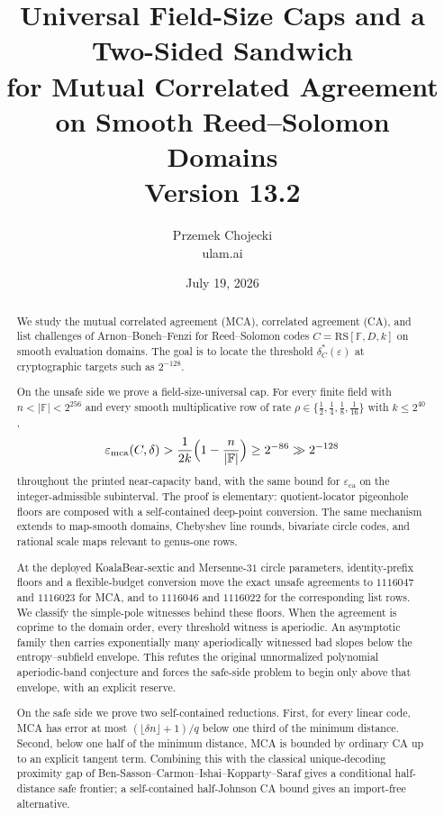 \documentclass[11pt]{article}
\title{Universal Field-Size Caps and a Two-Sided Sandwich\\ for Mutual Correlated Agreement on Smooth Reed--Solomon Domains\\\large Version 13.2}
\author{Przemek Chojecki\\ \small ulam.ai}
\date{July 19, 2026}
\theoremstyle{definition}
\theoremstyle{remark}
\newcommand{\F}{\mathbb{F}}
\newcommand{\RS}{\mathrm{RS}}
\newcommand{\eca}{\varepsilon_{\mathrm{ca}}}
\newcommand{\emca}{\varepsilon_{\mathrm{mca}}}
\begin{document}
\maketitle

\begin{abstract}
We study the mutual correlated agreement (MCA), correlated agreement (CA), and list challenges of Arnon--Boneh--Fenzi \cite{ABF26} for Reed--Solomon codes $C=\RS[\F,D,k]$ on smooth evaluation domains.  The goal is to locate the threshold $\delta_C^*(\varepsilon)$ at cryptographic targets such as $2^{-128}$.

On the unsafe side we prove a field-size-universal cap.  For every finite field with $n<|\F|<2^{256}$ and every smooth multiplicative row of rate $\rho\in\{\frac12,\frac14,\frac18,\frac1{16}\}$ with $k\le2^{40}$,
\[
\emca(C,\delta)>\frac1{2k}\Bigl(1-\frac n{|\F|}\Bigr)\ge2^{-86}\gg2^{-128}
\]
throughout the printed near-capacity band, with the same bound for $\eca$ on the integer-admissible subinterval.  The proof is elementary: quotient-locator pigeonhole floors are composed with a self-contained deep-point conversion.  The same mechanism extends to map-smooth domains, Chebyshev line rounds, bivariate circle codes, and rational scale maps relevant to genus-one rows.

At the deployed KoalaBear-sextic and Mersenne-$31$ circle parameters, identity-prefix floors and a flexible-budget conversion move the exact unsafe agreements to $1116047$ and $1116023$ for MCA, and to $1116046$ and $1116022$ for the corresponding list rows.  We classify the simple-pole witnesses behind these floors.  When the agreement is coprime to the domain order, every threshold witness is aperiodic.  An asymptotic family then carries exponentially many aperiodically witnessed bad slopes below the entropy--subfield envelope.  This refutes the original unnormalized polynomial aperiodic-band conjecture and forces the safe-side problem to begin only above that envelope, with an explicit reserve.

On the safe side we prove two self-contained reductions.  First, for every linear code, MCA has error at most $(\lfloor\delta n\rfloor+1)/q$ below one third of the minimum distance.  Second, below one half of the minimum distance, MCA is bounded by ordinary CA up to an explicit tangent term.  Combining this with the classical unique-decoding proximity gap of Ben-Sasson--Carmon--Ishai--Kopparty--Saraf \cite{BCIKS20} gives a conditional half-distance safe frontier; a self-contained half-Johnson CA bound gives an import-free alternative.


\end{abstract}
\end{document}
